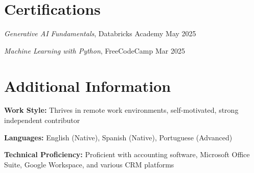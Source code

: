 \documentclass[letterpaper,10pt]{article}
\begin{document}
\section*{Certifications}
\begin{compactitem}
  \item[]
    \textit{Generative AI Fundamentals}, Databricks Academy \hfill May 2025
    \item[]
    \textit{Machine Learning with Python}, FreeCodeCamp \hfill Mar 2025
\end{compactitem}

\section*{Additional Information}
\begin{compactitem}
  \item[]
    \textbf{Work Style:} Thrives in remote work environments, self-motivated, strong independent contributor
    \item[]
    \textbf{Languages:} English (Native), Spanish (Native), Portuguese (Advanced)
    \item[]
    \textbf{Technical Proficiency:} Proficient with accounting software, Microsoft Office Suite, Google Workspace, and various CRM platforms
\end{compactitem}
\end{document}

